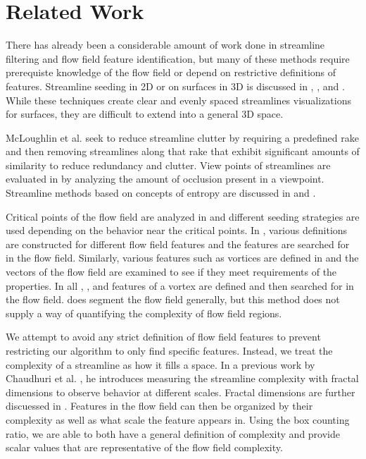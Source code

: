 \documentclass{egpubl}
\begin{document}
\section{Related Work}

There has already been a considerable amount of work done in streamline filtering and flow field feature identification, but many of these methods require prerequiste knowledge of the flow field or depend on restrictive definitions of features.
Streamline seeding in 2D or on surfaces in 3D is discussed in \cite{turk}, \cite{mao}, and \cite{mebarki}.
While these techniques create clear and evenly spaced streamlines visualizations for surfaces, they are difficult to extend into a general 3D space.

McLoughlin et al. \cite{mcloughlin} seek to reduce streamline clutter by requiring a predefined rake and then removing streamlines along that rake that exhibit significant amounts of similarity to reduce redundancy and clutter.
View points of streamlines are evaluated in \cite{marchesin} by analyzing the amount of occlusion present in a viewpoint.
Streamline methods based on concepts of entropy are discussed in \cite{shen} and \cite{lee}.

Critical points of the flow field are analyzed in \cite{ye} and different seeding strategies are used depending on the behavior near the critical points.
In \cite{salzbrunn}, various definitions are constructed for different flow field features and the features are searched for in the flow field.
Similarly, various features such as vortices are defined in \cite{heiberg} and the vectors of the flow field are examined to see if they meet requirements of the properties.
In all \cite{sadarjoen1999}, \cite{sadarjoen1998}, and \cite{zhong} features of a vortex are defined and then searched for in the flow field.
\cite{mahrous} does segment the flow field generally, but this method does not supply a way of quantifying the complexity of flow field regions.

We attempt to avoid any strict definition of flow field features to prevent restricting our algorithm to only find specific features.
Instead, we treat the complexity of a streamline as how it fills a space.
In a previous work by Chaudhuri et al. \cite{chaudhuri}, he introduces measuring the streamline complexity with fractal dimensions to observe behavior at different scales.
Fractal dimensions are further discuessed in \cite{khoury}.
Features in the flow field can then be organized by their complexity as well as what scale the feature appears in.
Using the box counting ratio, we are able to both have a general definition of complexity and provide scalar values that are representative of the flow field complexity.
\end{document}
